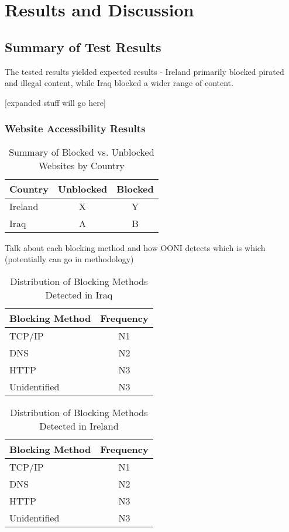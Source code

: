 \chapter{Results and Discussion}

\section{Summary of Test Results}

The tested results yielded expected results - Ireland primarily blocked pirated and illegal content, while Iraq blocked a wider range of content.

[expanded stuff will go here]

\subsection{Website Accessibility Results   }

\begin{table}[H]
\centering
\caption{Summary of Blocked vs. Unblocked Websites by Country}
\begin{tabular}{lcc}
\toprule
\textbf{Country} & \textbf{Unblocked} & \textbf{Blocked} \\
\midrule
Ireland & X & Y \\
Iraq    & A & B \\
\bottomrule
\end{tabular}
\label{tab:blocked_summary}
\end{table}

Talk about each blocking method and how OONI detects which is which (potentially can go in methodology)

\begin{table}[H]
\centering
\caption{Distribution of Blocking Methods Detected in Iraq}
\begin{tabular}{lc}
\toprule
\textbf{Blocking Method} & \textbf{Frequency} \\
\midrule
TCP/IP          & N1 \\
DNS & N2 \\
HTTP & N3 \\
Unidentified & N3 \\
\bottomrule
\end{tabular}
\label{tab:iraq_blocking_methods}
\end{table}

\begin{table}[H]
\centering
\caption{Distribution of Blocking Methods Detected in Ireland}
\begin{tabular}{lc}
\toprule
\textbf{Blocking Method} & \textbf{Frequency} \\
\midrule
TCP/IP          & N1 \\
DNS & N2 \\
HTTP & N3 \\
Unidentified & N3 \\
\bottomrule
\end{tabular}
\label{tab:ireland_blocking_methods}
\end{table}

